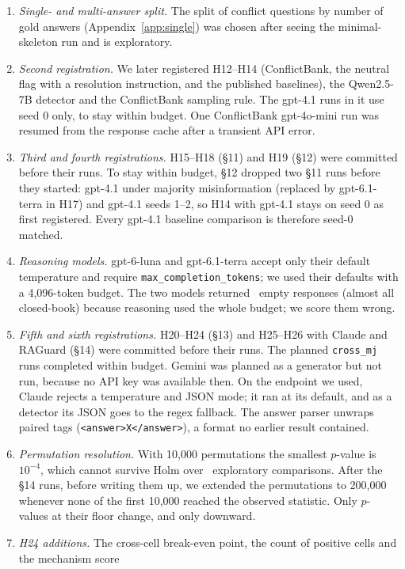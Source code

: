 \begin{enumerate}[leftmargin=*,itemsep=1pt,topsep=2pt]
\item \emph{Single- and multi-answer split.} The split of conflict questions by number of gold answers
(Appendix~\ref{app:single}) was chosen after seeing the minimal-skeleton run and is exploratory.
\item \emph{Second registration.} We later registered H12--H14 (ConflictBank, the neutral flag with a
resolution instruction, and the published baselines), the Qwen2.5-7B detector and the ConflictBank sampling rule.
The gpt-4.1 runs in it use seed 0 only, to stay within budget. One ConflictBank gpt-4o-mini run was resumed from the
response cache after a transient API error.
\item \emph{Third and fourth registrations.} H15--H18 (\S11) and H19 (\S12) were committed before their runs. To stay
within budget, \S12 dropped two \S11 runs before they started: gpt-4.1 under majority misinformation (replaced by
gpt-6.1-terra in H17) and gpt-4.1 seeds 1--2, so H14 with gpt-4.1 stays on seed 0 as first registered. Every
gpt-4.1 baseline comparison is therefore seed-0 matched.
\item \emph{Reasoning models.} gpt-6-luna and gpt-6.1-terra accept only their default temperature and require
\texttt{max\_completion\_tokens}; we used their defaults with a 4,096-token budget. The two models returned
\Nempty\ empty responses (almost all closed-book) because reasoning used the whole budget; we score them wrong.
\item \emph{Fifth and sixth registrations.} H20--H24 (\S13) and H25--H26 with Claude and RAGuard (\S14) were
committed before their runs. The planned \texttt{cross\_mj} runs completed within budget. Gemini was planned
as a generator but not run, because no API key was available then. On the endpoint we used, Claude rejects a temperature and JSON mode; it
ran at its default, and as a detector its JSON goes to the regex fallback. The answer
parser unwraps paired tags (\texttt{<answer>X</answer>}), a format no earlier result contained.
\item \emph{Permutation resolution.} With 10,000 permutations the smallest $p$-value is $10^{-4}$, which cannot
survive Holm over \nExploratory\ exploratory comparisons. After the \S14 runs, before writing them up, we
extended the permutations to 200,000 whenever none of the first 10,000 reached the observed statistic. Only
$p$-values at their floor change, and only downward.
\item \emph{H24 additions.} The cross-cell break-even point, the count of positive cells and the mechanism score

\end{enumerate}
